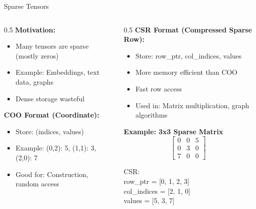 \documentclass[aspectratio=169,xcolor=dvipsnames]{beamer}
\begin{document}
\begin{frame}{Sparse Tensors}
  \begin{columns}
    \begin{column}{0.5\textwidth}
      \textbf{Motivation:}
      \begin{itemize}
        \item Many tensors are sparse (mostly zeros)
        \item Example: Embeddings, text data, graphs
        \item Dense storage wasteful
      \end{itemize}

      \vspace{0.3cm}
      \textbf{COO Format (Coordinate):}
      \begin{itemize}
        \item Store: (indices, values)
        \item Example: (0,2): 5, (1,1): 3, (2,0): 7
        \item Good for: Construction, random access
      \end{itemize}
    \end{column}

    \begin{column}{0.5\textwidth}
      \textbf{CSR Format (Compressed Sparse Row):}
      \begin{itemize}
        \item Store: row\_ptr, col\_indices, values
        \item More memory efficient than COO
        \item Fast row access
        \item Used in: Matrix multiplication, graph algorithms
      \end{itemize}

      \vspace{0.3cm}
      \textbf{Example: 3x3 Sparse Matrix}
      \[
      \begin{bmatrix}
      0 & 0 & 5 \\
      0 & 3 & 0 \\
      7 & 0 & 0
      \end{bmatrix}
      \]

      CSR: \\
      row\_ptr = [0, 1, 2, 3] \\
      col\_indices = [2, 1, 0] \\
      values = [5, 3, 7]
    \end{column}
  \end{columns}
\end{frame}
\end{document}
